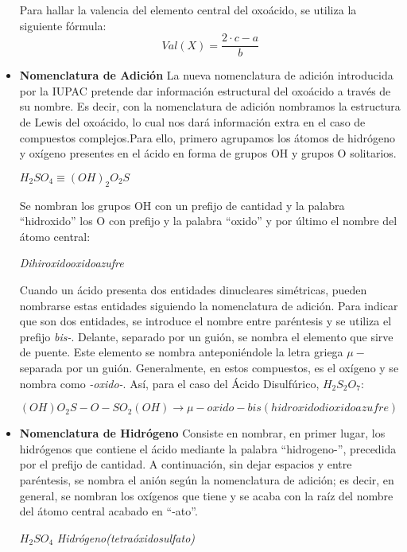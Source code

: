 \begin{itemize}
\begin{table} [h!]
	\end{table}
	Para hallar la valencia del elemento central del oxoácido, se utiliza la siguiente fórmula:
	\begin{equation}
		Val(X)=\frac{2\cdot c-a}{b}
	\end{equation}
	\item \textbf{Nomenclatura de Adición} La nueva nomenclatura de adición introducida por la IUPAC pretende dar información estructural del oxoácido a través de su nombre. Es decir, con la nomenclatura de adición nombramos la estructura de Lewis del oxoácido, lo cual nos dará información extra en el caso de compuestos complejos.Para ello, primero agrupamos los átomos de hidrógeno y oxígeno presentes en el ácido en forma de grupos OH y grupos O solitarios.
	\begin{center}
		$H_{2}SO_{4}  \equiv (OH)_{2}O_{2}S$
	\end{center}
	Se nombran los grupos OH con un prefijo de cantidad y la palabra “hidroxido” los O con prefijo y la palabra “oxido” y por último el nombre del átomo central:
	\begin{center}
		\textit{Dihiroxidooxidoazufre}
	\end{center}
	Cuando un ácido presenta dos entidades dinucleares simétricas, pueden nombrarse estas entidades siguiendo la nomenclatura de adición. Para indicar que son dos entidades, se introduce el nombre entre paréntesis y se utiliza el prefijo \emph{bis-}. Delante, separado por un guión, se nombra el elemento que sirve de puente. Este elemento se nombra anteponiéndole la letra griega \emph{$\mu -$} separada por un guión. Generalmente, en estos compuestos, es el oxígeno y se nombra como \emph{-oxido-}. Así, para el caso del Ácido Disulfúrico, $H_{2}S_{2}O_{7}$:
	\begin{center}
		$(OH)O_{2}S-O-SO_{2}(OH) \rightarrow \mu -oxido-bis(hidroxidodioxidoazufre)$
	\end{center}
	\item\textbf{Nomenclatura de Hidrógeno} Consiste en nombrar, en primer lugar, los hidrógenos que contiene el ácido mediante la palabra “hidrogeno-”, precedida por el prefijo de cantidad. A continuación, sin dejar espacios y entre paréntesis, se nombra el anión según la nomenclatura de adición; es decir, en general, se nombran los oxígenos que tiene y se acaba con la raíz del nombre del átomo central acabado en “-ato”.
	\begin{center}
		$H_{2}SO_{4}$ \textit{Hidrógeno(tetraóxidosulfato)}
	\end{center}
	
\end{itemize}

